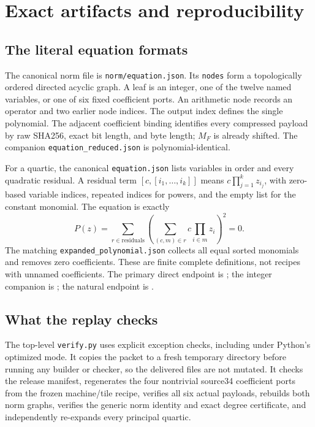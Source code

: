 \section{Exact artifacts and reproducibility}\label{sec:replay}
\subsection{The literal equation formats}
The canonical norm file is \texttt{norm/equation.json}. Its \texttt{nodes} form a topologically ordered directed acyclic graph. A leaf is an integer, one of the twelve named variables, or one of six fixed coefficient ports. An arithmetic node records an operator and two earlier node indices. The output index defines the single polynomial. The adjacent coefficient binding identifies every compressed payload by raw SHA256, exact bit length, and byte length; $M_F$ is already shifted. The companion \texttt{equation\_reduced.json} is polynomial-identical.

For a quartic, the canonical \texttt{equation.json} lists variables in order and every quadratic residual. A residual term $[c,[i_1,\ldots,i_k]]$ means $c\prod_{j=1}^kz_{i_j}$, with zero-based variable indices, repeated indices for powers, and the empty list for the constant monomial. The equation is exactly
\[
 P(z)=\sum_{r\in\mathrm{residuals}}\left(\sum_{(c,m)\in r}c\prod_{i\in m}z_i\right)^2=0.
\]
The matching \texttt{expanded\_polynomial.json} collects all equal sorted monomials and removes zero coefficients. These are finite complete definitions, not recipes with unnamed coefficients. The primary direct endpoint is ; the integer companion is ; the natural endpoint is .

\subsection{What the replay checks}
The top-level \texttt{verify.py} uses explicit exception checks, including under Python's optimized mode. It copies the packet to a fresh temporary directory before running any builder or checker, so the delivered files are not mutated. It checks the release manifest, regenerates the four nontrivial source34 coefficient ports from the frozen machine/tile recipe, verifies all six actual payloads, rebuilds both norm graphs, verifies the generic norm identity and exact degree certificate, and independently re-expands every principal quartic.

